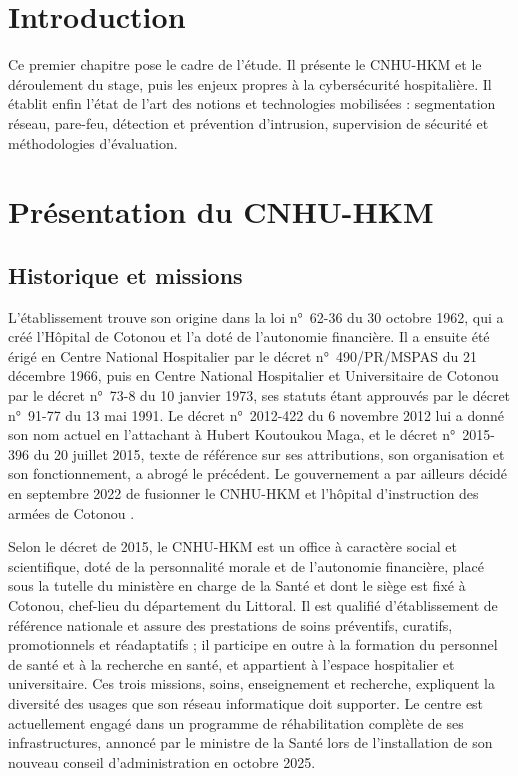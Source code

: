 \section*{Introduction}

Ce premier chapitre pose le cadre de l'étude. Il présente le CNHU-HKM et le déroulement du stage, puis les enjeux propres à la cybersécurité hospitalière. Il établit enfin l'état de l'art des notions et technologies mobilisées : segmentation réseau, pare-feu, détection et prévention d'intrusion, supervision de sécurité et méthodologies d'évaluation.

\section{Présentation du CNHU-HKM}

\subsection{Historique et missions}

L'établissement trouve son origine dans la loi n°~62-36 du 30 octobre 1962, qui a créé l'Hôpital de Cotonou et l'a doté de l'autonomie financière. Il a ensuite été érigé en Centre National Hospitalier par le décret n°~490/PR/MSPAS du 21 décembre 1966, puis en Centre National Hospitalier et Universitaire de Cotonou par le décret n°~73-8 du 10 janvier 1973, ses statuts étant approuvés par le décret n°~91-77 du 13 mai 1991\cite{decret2015}. Le décret n°~2012-422 du 6 novembre 2012 lui a donné son nom actuel en l'attachant à Hubert Koutoukou Maga\cite{decret2012}, et le décret n°~2015-396 du 20 juillet 2015, texte de référence sur ses attributions, son organisation et son fonctionnement, a abrogé le précédent\cite{decret2015}. Le gouvernement a par ailleurs décidé en septembre 2022 de fusionner le CNHU-HKM et l'hôpital d'instruction des armées de Cotonou\cite{fusion2022} .

Selon le décret de 2015, le CNHU-HKM est un office à caractère social et scientifique, doté de la personnalité morale et de l'autonomie financière, placé sous la tutelle du ministère en charge de la Santé et dont le siège est fixé à Cotonou, chef-lieu du département du Littoral\cite{decret2015}. Il est qualifié d'établissement de référence nationale et assure des prestations de soins préventifs, curatifs, promotionnels et réadaptatifs ; il participe en outre à la formation du personnel de santé et à la recherche en santé, et appartient à l'espace hospitalier et universitaire\cite{decret2015}. Ces trois missions, soins, enseignement et recherche, expliquent la diversité des usages que son réseau informatique doit supporter. Le centre est actuellement engagé dans un programme de réhabilitation complète de ses infrastructures, annoncé par le ministre de la Santé lors de l'installation de son nouveau conseil d'administration en octobre 2025\cite{ca2025}.

